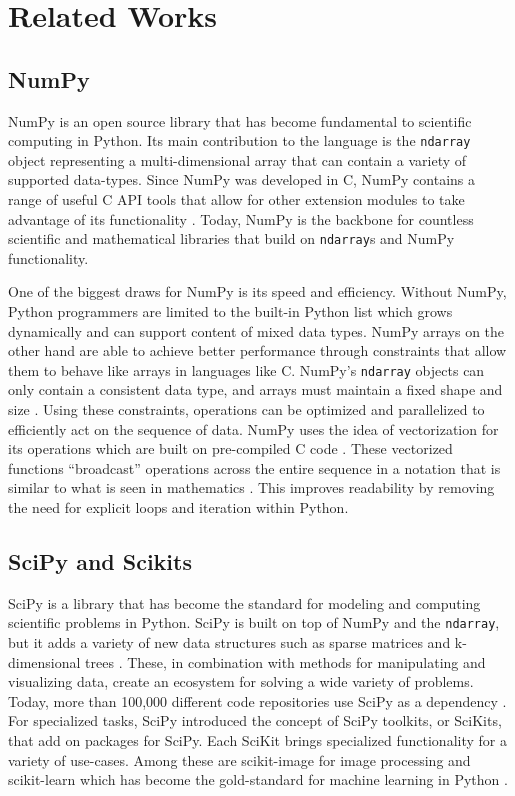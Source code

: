 \chapter{Related Works}

\section{NumPy}

NumPy is an open source library that has become fundamental to scientific computing in Python. Its main contribution to the language is the \verb|ndarray| object representing a multi-dimensional array that can contain a variety of supported data-types. Since NumPy was developed in C, NumPy contains a range of useful C API tools that allow for other extension modules to take advantage of its functionality \cite{numpyCApi}. Today, NumPy is the backbone for countless scientific and mathematical libraries that build on \verb|ndarray|s and NumPy functionality. 

\quad One of the biggest draws for NumPy is its speed and efficiency. Without NumPy, Python programmers are limited to the built-in Python list which grows dynamically and can support content of mixed data types. NumPy arrays on the other hand are able to achieve better performance through constraints that allow them to behave like arrays in languages like C. NumPy's \verb|ndarray| objects can only contain a consistent data type, and arrays must maintain a fixed shape and size \cite{arrayNumpy}. Using these constraints, operations can be optimized and parallelized to efficiently act on the sequence of data. NumPy uses the idea of vectorization for its operations which are built on pre-compiled C code \cite{numpyDocs}. These vectorized functions ``broadcast'' operations across the entire sequence in a notation that is similar to what is seen in mathematics \cite{numpyDocs}. This improves readability by removing the need for explicit loops and iteration within Python.

\section{SciPy and Scikits}

SciPy is a library that has become the standard for modeling and computing scientific problems in Python. SciPy is built on top of NumPy and the \verb|ndarray|, but it adds a variety of new data structures such as sparse matrices and k-dimensional trees \cite{scipy}. These, in combination with methods for manipulating and visualizing data, create an ecosystem for solving a wide variety of problems. Today, more than 100,000 different code repositories use SciPy as a dependency \cite{scipy}. For specialized tasks, SciPy introduced the concept of SciPy toolkits, or SciKits, that add on packages for SciPy. Each SciKit brings specialized functionality for a variety of use-cases. Among these are scikit-image for image processing and scikit-learn which has become the gold-standard for machine learning in Python \cite{scikits}.


